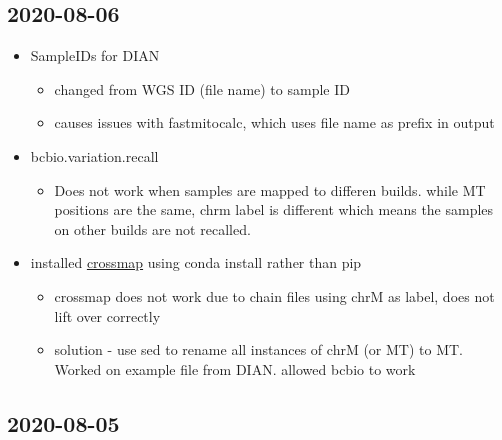\documentclass[]{book}
\providecommand{\tightlist}{%
  \setlength{\itemsep}{0pt}\setlength{\parskip}{0pt}}
\begin{document}
\hypertarget{section-6}{%
\subsection{2020-08-06}\label{section-6}}

\begin{itemize}
\tightlist
\item
  SampleIDs for DIAN

  \begin{itemize}
  \tightlist
  \item
    changed from WGS ID (file name) to sample ID
  \item
    causes issues with fastmitocalc, which uses file name as prefix in output
  \end{itemize}
\item
  bcbio.variation.recall

  \begin{itemize}
  \tightlist
  \item
    Does not work when samples are mapped to differen builds. while MT positions are the same, chrm label is different which means the samples on other builds are not recalled.
  \end{itemize}
\item
  installed \href{https://crossmap.readthedocs.io/en/latest/}{crossmap} using conda install rather than pip

  \begin{itemize}
  \tightlist
  \item
    crossmap does not work due to chain files using chrM as label, does not lift over correctly
  \item
    solution - use sed to rename all instances of chrM (or MT) to MT. Worked on example file from DIAN. allowed bcbio to work
  \end{itemize}
\end{itemize}

\hypertarget{section-7}{%
\subsection{2020-08-05}\label{section-7}}
\end{document}
